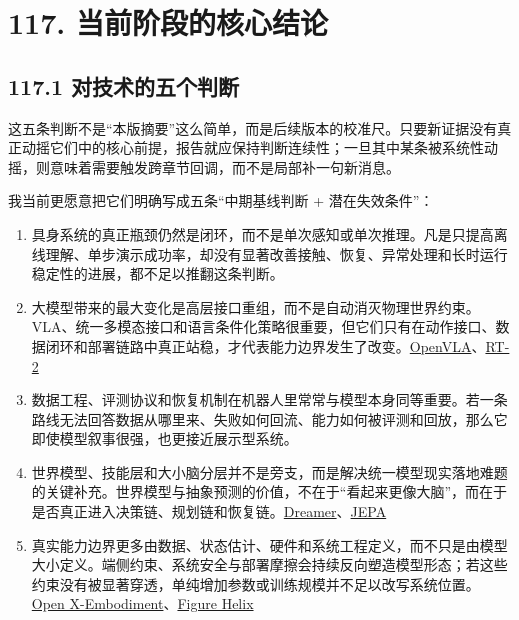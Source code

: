 

\section*{117. 当前阶段的核心结论}

\subsection*{117.1 对技术的五个判断}


这五条判断不是“本版摘要”这么简单，而是后续版本的校准尺。只要新证据没有真正动摇它们中的核心前提，报告就应保持判断连续性；一旦其中某条被系统性动摇，则意味着需要触发跨章节回调，而不是局部补一句新消息。

我当前更愿意把它们明确写成五条“中期基线判断 + 潜在失效条件”：

\begin{enumerate}
\item 具身系统的真正瓶颈仍然是闭环，而不是单次感知或单次推理。凡是只提高离线理解、单步演示成功率，却没有显著改善接触、恢复、异常处理和长时运行稳定性的进展，都不足以推翻这条判断。
\item 大模型带来的最大变化是高层接口重组，而不是自动消灭物理世界约束。VLA、统一多模态接口和语言条件化策略很重要，但它们只有在动作接口、数据闭环和部署链路中真正站稳，才代表能力边界发生了改变。\href{https://arxiv.org/abs/2406.09246}{OpenVLA}、\href{https://arxiv.org/abs/2307.15818}{RT-2}
\item 数据工程、评测协议和恢复机制在机器人里常常与模型本身同等重要。若一条路线无法回答数据从哪里来、失败如何回流、能力如何被评测和回放，那么它即使模型叙事很强，也更接近展示型系统。
\item 世界模型、技能层和大小脑分层并不是旁支，而是解决统一模型现实落地难题的关键补充。世界模型与抽象预测的价值，不在于“看起来更像大脑”，而在于是否真正进入决策链、规划链和恢复链。\href{https://arxiv.org/abs/1912.01603}{Dreamer}、\href{https://arxiv.org/abs/2301.08243}{JEPA}
\item 真实能力边界更多由数据、状态估计、硬件和系统工程定义，而不只是由模型大小定义。端侧约束、系统安全与部署摩擦会持续反向塑造模型形态；若这些约束没有被显著穿透，单纯增加参数或训练规模并不足以改写系统位置。\href{https://arxiv.org/abs/2310.08864}{Open X-Embodiment}、\href{https://www.figure.ai/news/helix}{Figure Helix}
\end{enumerate}

